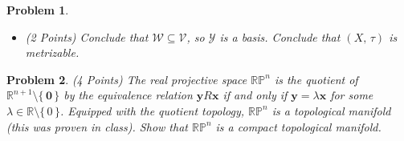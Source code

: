 \documentclass{article}
\theoremstyle{normal}
\newtheorem{problem}{Problem}
\begin{document}
\begin{problem}
\begin{itemize}
                We want to show $\mathcal{Y}$ is a basis for $\tau$.
                Given $x\in{X}$ and $\mathcal{V}\in\tau$ with $x\in\mathcal{V}$,
                since $\mathcal{X}$ is locally finite, there are only finitely
                many sets $\mathcal{U}_{0},\,\dots,\,\mathcal{U}_{n}$ in
                $\mathcal{X}$ that contain $x$. So
                $\mathcal{V}\cap\mathcal{U}_{k}$ is an open subset of
                $\mathcal{U}_{k}$ for all $k\in\mathbb{Z}_{n+1}$ that contains
                $x$, so there is an $\varepsilon_{k}>0$ such that
                $B_{\varepsilon_{k}}^{(\mathcal{U}_{k},\,d_{\mathcal{U}_{k}})}(x)\subseteq\mathcal{V}\cap\mathcal{U}_{k}$.
                Let $q\in\mathbb{Q}^{+}$ be less than
                $\textrm{min}\{\,\varepsilon_{k}\;|\;k\in\mathbb{Z}_{n+1}\,\}/2$.
                Since $\mathcal{Y}_{q}$ covers $X$ there is a set
                $\mathcal{W}\in\mathcal{Y}_{q}$ such that $x\in\mathcal{W}$.
                Since $\mathcal{Y}_{q}$ is a refinement of $\mathcal{A}_{q}$
                there is an open ball
                $B_{q}^{(\mathcal{U},\,d_{\mathcal{U}})}(y)\in\mathcal{A}_{q}$
                that contains $\mathcal{W}$. Show that $\mathcal{U}$ is actually
                one of the sets $\mathcal{U}_{0},\,\dots,\,\mathcal{U}_{n}$.
                [Hint: You just need to show that $x\in\mathcal{U}$ is true].
            \item (2 Points)
                Conclude that $\mathcal{W}\subseteq\mathcal{V}$, so
                $\mathcal{Y}$ is a basis. Conclude that $(X,\,\tau)$ is
                metrizable.
        \end{itemize}
    \end{problem}
    \begin{problem}
        (4 Points)
        The real projective space $\mathbb{RP}^{n}$ is the quotient of
        $\mathbb{R}^{n+1}\setminus\{\,\mathbf{0}\,\}$ by the equivalence
        relation $\mathbf{y}R\mathbf{x}$ if and only if
        $\mathbf{y}=\lambda\mathbf{x}$ for some
        $\lambda\in\mathbb{R}\setminus\{\,0\,\}$. Equipped with the quotient
        topology, $\mathbb{RP}^{n}$ is a topological manifold (this was proven
        in class). Show that $\mathbb{RP}^{n}$ is a compact
        topological manifold.
    \end{problem}
\end{document}
